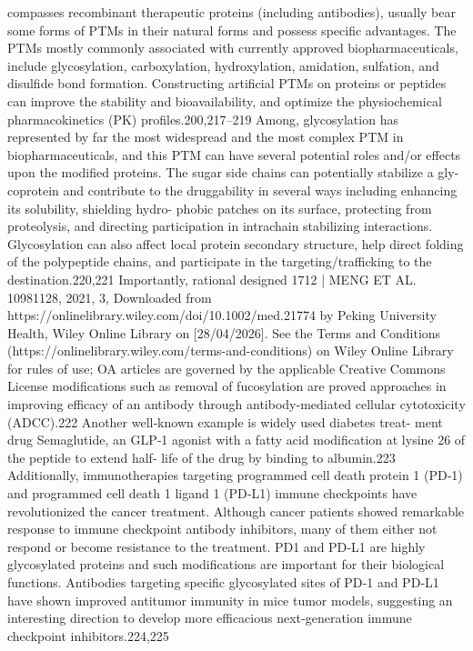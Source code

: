 compasses recombinant therapeutic proteins (including antibodies), usually bear some forms of PTMs in their
natural forms and possess specific advantages. The PTMs mostly commonly associated with currently approved
biopharmaceuticals, include glycosylation, carboxylation, hydroxylation, amidation, sulfation, and disulfide bond
formation. Constructing artificial PTMs on proteins or peptides can improve the stability and bioavailability, and
optimize the physiochemical pharmacokinetics (PK) profiles.200,217–219 Among, glycosylation has represented by
far the most widespread and the most complex PTM in biopharmaceuticals, and this PTM can have several
potential roles and/or effects upon the modified proteins. The sugar side chains can potentially stabilize a gly-
coprotein and contribute to the druggability in several ways including enhancing its solubility, shielding hydro-
phobic patches on its surface, protecting from proteolysis, and directing participation in intrachain stabilizing
interactions. Glycosylation can also affect local protein secondary structure, help direct folding of the polypeptide
chains, and participate in the targeting/trafficking to the destination.220,221 Importantly, rational designed
1712 |
MENG ET AL.
 10981128, 2021, 3, Downloaded from https://onlinelibrary.wiley.com/doi/10.1002/med.21774 by Peking University Health, Wiley Online Library on [28/04/2026]. See the Terms and Conditions (https://onlinelibrary.wiley.com/terms-and-conditions) on Wiley Online Library for rules of use; OA articles are governed by the applicable Creative Commons License
modifications such as removal of fucosylation are proved approaches in improving efficacy of an antibody through
antibody‐mediated cellular cytotoxicity (ADCC).222 Another well‐known example is widely used diabetes treat-
ment drug Semaglutide, an GLP‐1 agonist with a fatty acid modification at lysine 26 of the peptide to extend half‐
life of the drug by binding to albumin.223 Additionally, immunotherapies targeting programmed cell death protein 1
(PD‐1) and programmed cell death 1 ligand 1 (PD‐L1) immune checkpoints have revolutionized the cancer
treatment. Although cancer patients showed remarkable response to immune checkpoint antibody inhibitors, many
of them either not respond or become resistance to the treatment. PD1 and PD‐L1 are highly glycosylated proteins
and such modifications are important for their biological functions. Antibodies targeting specific glycosylated sites
of PD‐1 and PD‐L1 have shown improved antitumor immunity in mice tumor models, suggesting an interesting
direction to develop more efficacious next‐generation immune checkpoint inhibitors.224,225

